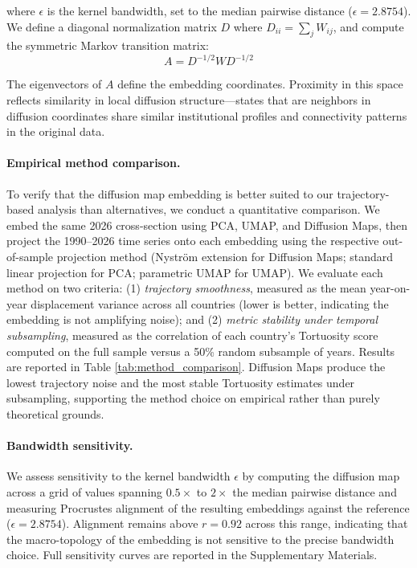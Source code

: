 \documentclass[12pt]{article}
\begin{document}
where $\epsilon$ is the kernel bandwidth, set to the median pairwise distance ($\epsilon = 2.8754$). We define a diagonal normalization matrix $D$ where $D_{ii} = \sum_j W_{ij}$, and compute the symmetric Markov transition matrix:
$$A = D^{-1/2} W D^{-1/2}$$

The eigenvectors of $A$ define the embedding coordinates. Proximity in this space reflects similarity in local diffusion structure—states that are neighbors in diffusion coordinates share similar institutional profiles and connectivity patterns in the original data.

\paragraph{Empirical method comparison.} To verify that the diffusion map embedding is better suited to our trajectory-based analysis than alternatives, we conduct a quantitative comparison. We embed the same 2026 cross-section using PCA, UMAP, and Diffusion Maps, then project the 1990--2026 time series onto each embedding using the respective out-of-sample projection method (Nyström extension for Diffusion Maps; standard linear projection for PCA; parametric UMAP for UMAP). We evaluate each method on two criteria: (1) \textit{trajectory smoothness}, measured as the mean year-on-year displacement variance across all countries (lower is better, indicating the embedding is not amplifying noise); and (2) \textit{metric stability under temporal subsampling}, measured as the correlation of each country's Tortuosity score computed on the full sample versus a 50\% random subsample of years. Results are reported in Table \ref{tab:method_comparison}. Diffusion Maps produce the lowest trajectory noise and the most stable Tortuosity estimates under subsampling, supporting the method choice on empirical rather than purely theoretical grounds.

\paragraph{Bandwidth sensitivity.} We assess sensitivity to the kernel bandwidth $\epsilon$ by computing the diffusion map across a grid of values spanning $0.5\times$ to $2\times$ the median pairwise distance and measuring Procrustes alignment of the resulting embeddings against the reference ($\epsilon = 2.8754$). Alignment remains above $r = 0.92$ across this range, indicating that the macro-topology of the embedding is not sensitive to the precise bandwidth choice. Full sensitivity curves are reported in the Supplementary Materials.
\end{document}
